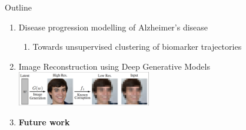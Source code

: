 \documentclass[8pt,xcolor=table]{beamer}
\begin{document}
\begin{frame}{Outline}

\begin{enumerate}
 \item Disease progression modelling of Alzheimer's disease
 \begin{enumerate} 
  \item Towards unsupervised clustering of biomarker trajectories\\
 \end{enumerate}
   
 
  
  \vt

 \item Image Reconstruction using Deep Generative Models\\
 \includegraphics[height=1.5cm, trim=6 6 300 6,clip]{brgm_diagram_small}
\vt
 
  \item \textbf{Future work}\\

\end{enumerate}
\end{frame}
\end{document}

